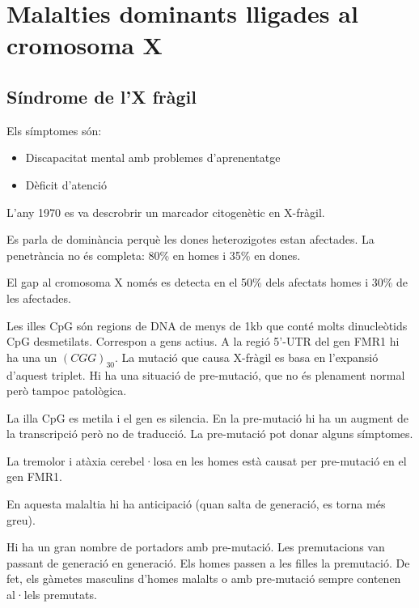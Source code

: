 \section{Malalties dominants lligades al cromosoma X}
\label{sec:malalt-domin-llig}

\subsection{Síndrome de l'X fràgil}
\label{sec:x-fragil}

Els símptomes són:
\begin{itemize}
\item Discapacitat mental amb problemes d'aprenentatge
\item Dèficit d'atenció
\end{itemize}

L'any 1970 es va descrobrir un marcador citogenètic en X-fràgil.

Es parla de dominància perquè les dones heterozigotes estan afectades. La penetrància no és completa: 80\% en homes i 35\% en dones.

El gap al cromosoma X només es detecta en el 50\% dels afectats homes i 30\% de les afectades.

Les illes CpG són regions de DNA de menys de 1kb que conté molts dinucleòtids CpG desmetilats. Correspon a gens actius. A la regió 5'-UTR del gen FMR1 hi ha una un $(CGG)_{30}$. La mutació que causa X-fràgil es basa en l'expansió d'aquest triplet. Hi ha una situació de pre-mutació, que no és plenament normal però tampoc patològica. 

La illa CpG es metila i el gen es silencia. En la pre-mutació hi ha un augment de la transcripció però no de traducció. La pre-mutació pot donar alguns símptomes.

La tremolor i atàxia cerebel·losa en les homes està causat per pre-mutació en el gen FMR1. 

En aquesta malaltia hi ha anticipació (quan salta de generació, es
torna més greu).

Hi ha un gran nombre de portadors amb pre-mutació. Les premutacions
van passant de generació en generació. Els homes passen a les filles
la premutació. De fet, els gàmetes masculins d'homes malalts o amb
pre-mutació sempre contenen al·lels premutats.

